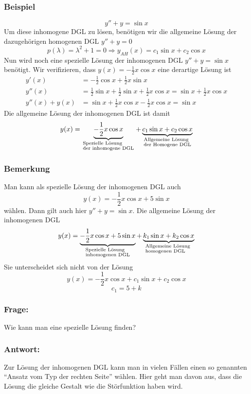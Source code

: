 \subsubsection*{Beispiel}
\[y''+y=\sin x\]
Um diese inhomogene DGL zu lösen, benötigen wir die allgemeine Lösung der dazugehörigen homogenen DGL $y''+y=0$\[p(\lambda)=\lambda^2+1=0\Rightarrow y_{AH}(x)=c_1\sin x+c_2\cos x\] Nun wird noch eine spezielle Lösung der inhomogenen DGL $y''+y=\sin x$ benötigt. Wir verifizieren, dass $y(x)=-\frac{1}{2}x\cos x$ eine derartige Lösung ist
\begin{align*}
y'(x)&=-\frac{1}{2}\cos x+\frac{1}{2}x\sin x\\
y''(x)&=\frac{1}{2}\sin x+\frac{1}{2}\sin x+\frac{1}{2}x\cos x=\sin x+\frac{1}{2}x\cos x\\
y''(x)+y(x)&=\sin x+\frac{1}{2}x\cos x-\frac{1}{2}x\cos x=\sin x
\end{align*}
Die allgemeine Lösung der inhomogenen DGL ist damit $$y(x) = \underbrace { - \frac{1}{2}x\cos x}_{\scriptstyle{\text{Spezielle Lösung }}\hfill\atop
\scriptstyle{\text{der inhomogene DGL}}\hfill} + \underbrace {{c_1}\sin x + {c_2}\cos x}_{\scriptstyle{\text{Allgemeine Lösung }}\hfill\atop
\scriptstyle{\text{der Homogene DGL}}\hfill}$$
\subsubsection*{Bemerkung}
Man kann als spezielle Lösung der inhomogenen DGL auch \[y(x)=-\frac{1}{2}x\cos x+5\sin x\] wählen. Dann gilt auch hier $y''+y=\sin x$. Die allgemeine Lösung der inhomogenen DGL
\[y(x) = \underbrace { - \frac{1}{2}x\cos x + 5\sin x}_{\scriptstyle{\text{Spezielle Lösung }}\hfill\atop
\scriptstyle{\text{inhomogenen DGL}}\hfill} + \underbrace {{k_1}\sin x + {k_2}\cos x}_{\scriptstyle{\text{Allgemeine Lösung }}\hfill\atop
\scriptstyle{\text{homogenen DGL}}\hfill}\] Sie unterscheidet sich nicht von der Lösung \[y(x)=-\frac{1}{2}x\cos x+c_1\sin x+c_2\cos x\]
\[c_1=5+k\]
\subsubsection*{Frage:}
Wie kann man eine spezielle Lösung finden?
\subsubsection*{Antwort:}
Zur Lösung der inhomogenen DGL kann man in vielen Fällen einen so genannten ``Ansatz vom Typ der rechten Seite'' wählen. Hier geht man davon aus, dass die Lösung die gleiche Gestalt wie die Störfunktion haben wird.\\

